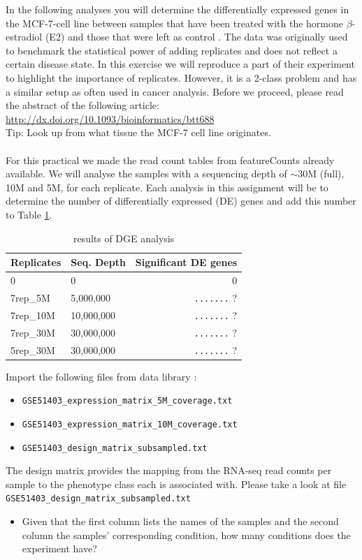 In the following analyses you will determine the differentially expressed genes in the MCF-7-cell line between samples that have been treated with the hormone $\beta$-estradiol (E2) and those that were left as control \citep{mcf7}.
The data was originally used to benchmark the statistical power of adding replicates and does not reflect a certain disease state.
In this exercise we will reproduce a part of their experiment to highlight the importance of replicates.
However, it is a 2-class problem and has a similar setup as often used in cancer analysis.
Before we proceed, please read the abstract of the following article:
\url{http://dx.doi.org/10.1093/bioinformatics/btt688}\\
Tip: Look up from what tissue the MCF-7 cell line originates.\\
\\
For this practical we made the read count tables from featureCounts already available.
We will analyse the samples with a sequencing depth of $\sim$30M (full), 10M and 5M, for each replicate.
Each analysis in this assignment will be to determine the number of differentially expressed (DE) genes and add this number to Table \ref{tab:dge_ad_01}.
\begin{table}[]
\centering
\caption{results of DGE analysis}
\label{tab:dge_ad_01}
\begin{tabular}{ | l | l | r | }
\hline
Replicates & Seq. Depth & Significant DE genes \\
\hline
0          & 0          & 0\quad\quad \\
7rep\_5M   & 5,000,000  & \verb|.......| ? \\
7rep\_10M  & 10,000,000 & \verb|.......| ? \\
7rep\_30M  & 30,000,000 & \verb|.......| ? \\
5rep\_30M  & 30,000,000 & \verb|.......| ? \\
\hline
\end{tabular}
\end{table}
Import the following files from data library \textit{\datalibrarydirrnaseqadvanced}:
\begin{itemize}
	\item[] \verb|GSE51403_expression_matrix_5M_coverage.txt|
	\item[] \verb|GSE51403_expression_matrix_10M_coverage.txt|
	\item[] \verb|GSE51403_design_matrix_subsampled.txt|
\end{itemize}
The design matrix provides the mapping from the RNA-seq read counts per sample to the phenotype class each is associated with.
Please take a look at file \verb|GSE51403_design_matrix_subsampled.txt|
\begin{itemize}
	\item Given that the first column lists the names of the samples and the second column the samples' corresponding condition, how many conditions does the experiment have?
\end{itemize}
